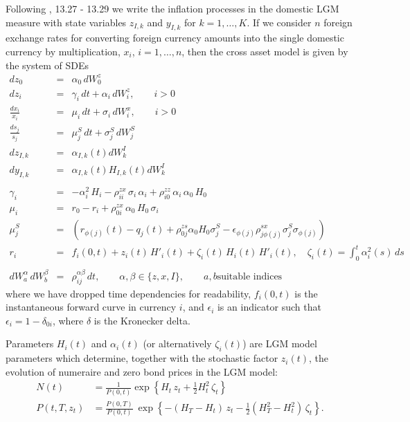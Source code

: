 \documentclass[12pt, a4paper]{article}
\begin{document}
\begin{appendix}
Following \cite{Lichters}, 13.27 - 13.29 we write the inflation processes 
in the domestic LGM measure with state variables $z_{I,k}$ and $y_{I,k}$ for $k=1,\ldots,K$.  If we consider $n$ 
foreign exchange rates for converting foreign currency amounts into the single domestic currency by multiplication, 
$x_i$, $i=1,\dots,n$, then the cross asset model is given by the system of SDEs
\begin{eqnarray*}
dz_0 &=& \alpha_0\,dW_0^z \\
dz_i &=& \gamma_i\,dt + \alpha_i\,dW_i^z,  \qquad i>0 \\
\frac{d x_i}{x_i} &=& \mu_i\, dt + \sigma_i\,dW_i^x, \qquad i > 0 \\
\frac{d s_j}{s_j} &=& \mu_j^S\, dt + \sigma_j^S\,dW_j^S \\
dz_{I,k} &=& \alpha_{I,k}(t)dW_k^I \\
dy_{I,k} &=& \alpha_{I,k}(t)H_{I,k}(t)dW_k^I \\ \\
\gamma_i &=&
-\alpha_i^2\,H_i -\rho_{ii}^{zx}\,\sigma_i\,\alpha_i + \rho_{i0}^{zz}\,\alpha_i\,\alpha_0\,H_0\\
\mu_i &=& r_0 - r_i + \rho_{0i}^{zx}\,\alpha_0\,H_0\,\sigma_i\\
\mu_j^S &=& (r_{\phi(j)}(t) - q_j(t) + \rho_{0j}^{zs} \alpha_0 H_0 \sigma_j^S - \epsilon_{\phi(j)}
\rho_{j \phi(j)}^{sx}\sigma_j^S \sigma_{\phi(j)}) \\
r_i &=& f_i(0,t) + z_i(t)\,H'_i(t) + \zeta_i(t)\,H_i(t)\,H'_i(t),
\quad \zeta_i(t) = \int_0^t \alpha_i^2(s)\,ds  \\ \\
dW^\alpha_a\,dW^\beta_b &=& \rho^{\alpha\beta}_{ij}\,dt, \qquad \alpha, \beta \in \{z, x, I\}, \qquad a, b \text{
                              suitable indices }
\end{eqnarray*}
where we have dropped time dependencies for readability, $f_i(0,t)$ is the instantaneous forward curve in currency $i$, 
and $\epsilon_i$ is an indicator such that $\epsilon_i = 1 - \delta_{0i}$, where $\delta$ is the Kronecker delta.

\medskip Parameters $H_i(t)$ and $\alpha_i(t)$ (or alternatively $\zeta_i(t)$) are LGM model parameters which determine,
together with the stochastic factor $z_i(t)$, the evolution of numeraire and zero bond prices in the LGM model:
\begin{align}
N(t) &= \frac{1}{P(0,t)}\exp\left\{H_t\, z_t + \frac{1}{2}H^2_t\,\zeta_t \right\}
\label{lgm1f_numeraire} \\
P(t,T,z_t)
&= \frac{P(0,T)}{P(0,t)}\:\exp\left\{ -(H_T-H_t)\,z_t - \frac{1}{2} \left(H^2_T-H^2_t\right)\,\zeta_t\right\}.
\label{lgm1f_zerobond}
\end{align}


\end{appendix}
\end{document}
